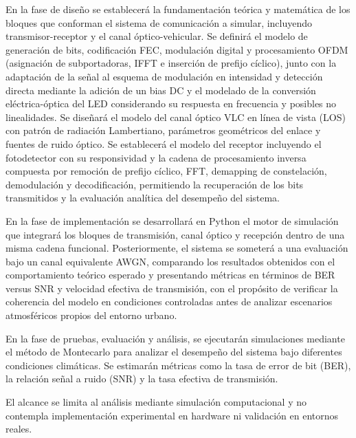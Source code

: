 En la fase de diseño se establecerá la fundamentación teórica y matemática de los bloques que conforman el sistema de comunicación a simular, incluyendo transmisor-receptor y el canal óptico-vehicular. Se definirá el modelo de generación de bits, codificación FEC, modulación digital y procesamiento OFDM (asignación de subportadoras, IFFT e inserción de prefijo cíclico), junto con la adaptación de la señal al esquema de modulación en intensidad y detección directa mediante la adición de un bias DC y el modelado de la conversión eléctrica-óptica del LED considerando su respuesta en frecuencia y posibles no linealidades. Se diseñará el modelo del canal óptico VLC en línea de vista (LOS) con patrón de radiación Lambertiano, parámetros geométricos del enlace y fuentes de ruido óptico. Se establecerá el modelo del receptor incluyendo el fotodetector con su responsividad y la cadena de procesamiento inversa compuesta por remoción de prefijo cíclico, FFT, demapping de constelación, demodulación y decodificación, permitiendo la recuperación de los bits transmitidos y la evaluación analítica del desempeño del sistema.


En la fase de implementación se desarrollará en Python el motor de simulación que integrará los bloques de transmisión, canal óptico y recepción dentro de una misma cadena funcional. Posteriormente, el sistema se someterá a una evaluación bajo un canal equivalente AWGN, comparando los resultados obtenidos con el comportamiento teórico esperado y presentando métricas en términos de BER versus SNR y velocidad efectiva de transmisión, con el propósito de verificar la coherencia del modelo en condiciones controladas antes de analizar escenarios atmosféricos propios del entorno urbano.

En la fase de pruebas, evaluación y análisis, se ejecutarán simulaciones mediante el método de Montecarlo para analizar el desempeño del sistema bajo diferentes condiciones climáticas. Se estimarán métricas como la tasa de error de bit (BER), la relación señal a ruido (SNR) y la tasa efectiva de transmisión.

El alcance se limita al análisis mediante simulación computacional y no contempla implementación experimental en hardware ni validación en entornos reales.

